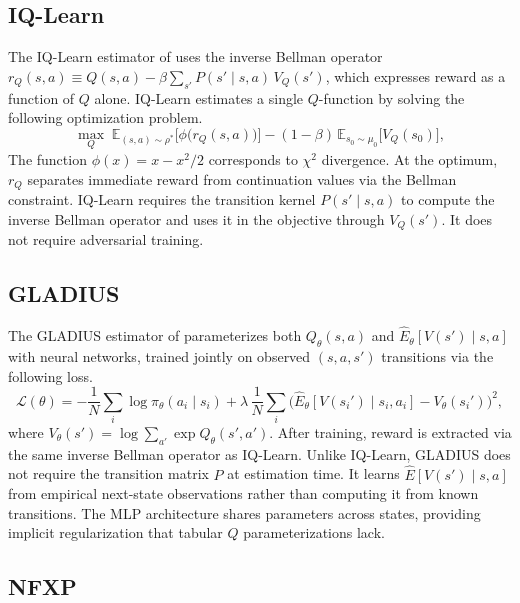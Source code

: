 \documentclass[11pt]{article}
\begin{document}
\subsection{IQ-Learn}

The IQ-Learn estimator of \citet{garg2021} uses the inverse Bellman operator $r_Q(s,a) \equiv Q(s,a) - \beta \sum_{s'} P(s' \mid s,a)\, V_Q(s')$, which expresses reward as a function of $Q$ alone. IQ-Learn estimates a single $Q$-function by solving the following optimization problem.
\begin{equation}\label{eq:iq_obj}
\max_Q \;\mathbb{E}_{(s,a) \sim \rho^*}\bigl[\phi\bigl(r_Q(s,a)\bigr)\bigr] - (1-\beta)\,\mathbb{E}_{s_0 \sim \mu_0}\bigl[V_Q(s_0)\bigr],
\end{equation}
The function $\phi(x) = x - x^2/2$ corresponds to $\chi^2$ divergence. At the optimum, $r_Q$ separates immediate reward from continuation values via the Bellman constraint. IQ-Learn requires the transition kernel $P(s' \mid s, a)$ to compute the inverse Bellman operator and uses it in the objective through $V_Q(s')$. It does not require adversarial training.

\subsection{GLADIUS}

The GLADIUS estimator of \citet{kang2025} parameterizes both $Q_\theta(s,a)$ and $\hat{E}_\theta[V(s') \mid s,a]$ with neural networks, trained jointly on observed $(s,a,s')$ transitions via the following loss.
\begin{equation}\label{eq:gladius}
\mathcal{L}(\theta) = -\frac{1}{N}\sum_{i}\log\pi_\theta(a_i \mid s_i)
  + \lambda\,\frac{1}{N}\sum_{i}\bigl(\hat{E}_\theta[V(s_i') \mid s_i,a_i] - V_\theta(s_i')\bigr)^{2},
\end{equation}
where $V_\theta(s') = \log\sum_{a'}\exp Q_\theta(s',a')$. After training, reward is extracted via the same inverse Bellman operator as IQ-Learn. Unlike IQ-Learn, GLADIUS does not require the transition matrix $P$ at estimation time. It learns $\hat{E}[V(s') \mid s, a]$ from empirical next-state observations rather than computing it from known transitions. The MLP architecture shares parameters across states, providing implicit regularization that tabular $Q$ parameterizations lack.

\subsection{NFXP}
\end{document}
